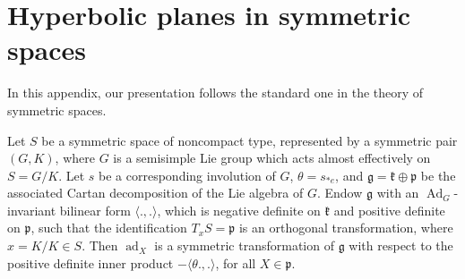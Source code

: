 \documentclass[12pt,a4paper]{amsart}
\numberwithin{equation}{section}
\theoremstyle{definition}
\DeclareMathOperator{\ad}{ad}
\DeclareMathOperator{\Ad}{Ad}
\def\la{\langle}
\def\ra{\rangle}
\begin{document}
\appendix
\section{Hyperbolic planes in symmetric spaces}\label{symm}
In this appendix, our presentation follows the standard one in the theory of symmetric spaces.

Let $S$ be a symmetric space of noncompact type, represented by a symmetric pair $(G,K)$,
where $G$ is a semisimple Lie group which acts almost effectively on $S=G/K$.
Let $s$ be a corresponding involution of $G$, $\theta=s_{*e}$,
and $\mathfrak g=\mathfrak k\oplus\mathfrak p$ be the associated Cartan decomposition of the Lie algebra of $G$.
Endow $\mathfrak g$ with an $\Ad_G$-invariant bilinear form $\la.,.\ra$,
which is negative definite on $\mathfrak k$ and positive definite on $\mathfrak p$,
such that the identification $T_xS=\mathfrak p$ is an orthogonal transformation, where $x=K/K\in S$.
Then $\ad_X$ is a symmetric transformation of $\mathfrak g$ with respect to the positive definite inner product $-\la\theta.,.\ra$,
for all $X\in\mathfrak p$.
\end{document}
